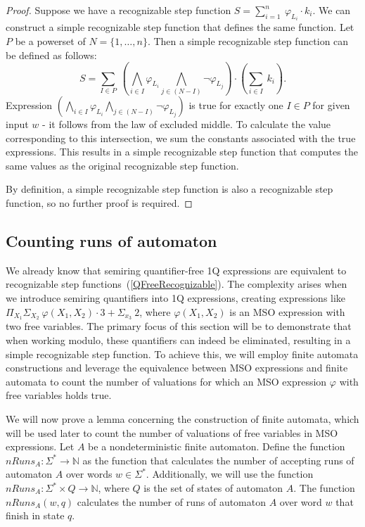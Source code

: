 \documentclass[12pt]{article}
\theoremstyle{definition}
\begin{document}
\begin{proof}
    Suppose we have a recognizable step function $S = \sum_{i = 1}^{n} \ \varphi_{L_i} \cdot k_i$. We can construct a simple recognizable step function that defines the same function. Let $P$ be a powerset of $N = \{1,\ldots,n\}$. Then a simple recognizable step function can be defined as follows:
    $$S = \sum_{I \in P} \ (\bigwedge_{i \in I} \varphi_{L_i} \bigwedge_{j \in (N-I)} \neg \varphi_{L_j}) \cdot (\sum_{i \in I} \ k_i).$$
    Expression $(\bigwedge_{i \in I} \varphi_{L_i} \bigwedge_{j \in (N-I)} \neg \varphi_{L_j})$ is true for exactly one $I \in P$ for given input $w$ - it follows from the law of excluded middle. To calculate the value corresponding to this intersection, we sum the constants associated with the true expressions. This results in a simple recognizable step function that computes the same values as the original recognizable step function.

    By definition, a simple recognizable step function is also a recognizable step function, so no further proof is required.
\end{proof}

\subsection{Counting runs of automaton}

We already know that semiring quantifier-free 1Q expressions are equivalent to recognizable step functions~(\cref{QFreeRecognizable}). The complexity arises when we introduce semiring quantifiers into 1Q expressions, creating expressions like $\Pi_{X_1} \Sigma_{X_2} \ \varphi(X_1, X_2) \cdot 3 + \Sigma_{x_3} \ 2$, where $\varphi(X_1, X_2)$ is an MSO expression with two free variables. The primary focus of this section will be to demonstrate that when working modulo, these quantifiers can indeed be eliminated, resulting in a simple recognizable step function. To achieve this, we will employ finite automata constructions and leverage the equivalence between MSO expressions and finite automata to count the number of valuations for which an MSO expression $\varphi$ with free variables holds true.

We will now prove a lemma concerning the construction of finite automata, which will be used later to count the number of valuations of free variables in MSO expressions. Let $A$ be a nondeterministic finite automaton. Define the function $nRuns_A : \Sigma^* \rightarrow \mathbb{N}$ as the function that calculates the number of accepting runs of automaton $A$ over words $w \in \Sigma^*$. Additionally, we will use the function $nRuns_A : \Sigma^* \times Q \rightarrow \mathbb{N}$, where $Q$ is the set of states of automaton $A$. The function $nRuns_A(w, q)$ calculates the number of runs of automaton $A$ over word $w$ that finish in state $q$.
\end{document}
